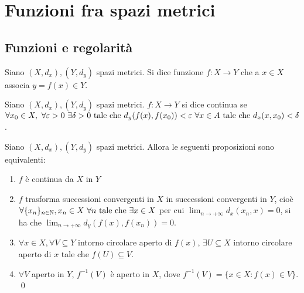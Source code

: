 \chapter{Funzioni fra spazi metrici}\label{chap:functions}

\section{Funzioni e regolarità}

\begin{definition}
    Siano $(X, d_x), (Y, d_y)$ spazi metrici. Si dice funzione $f: X \to Y$ che a $x \in X$ associa $y = f(x) \in Y$.
\end{definition}

\begin{definition}
    \label{def:f_cont}
    Siano $(X, d_x), (Y, d_y)$ spazi metrici. $f: X \to Y$ si dice continua se $\forall x_0 \in X, \ \forall \varepsilon > 0 \ \exists \delta > 0 \tc d_y(f(x), f(x_0)) < \varepsilon \ \forall x \in A \tc d_x(x, x_0) < \delta$.
\end{definition}

\begin{theorem}
    Siano $(X, d_x), (Y, d_y)$ spazi metrici. Allora le seguenti proposizioni sono equivalenti:
    \begin{enumerate}
        \item $f$ è continua da $X$ in $Y$
        
        \item $f$ trasforma successioni convergenti in $X$ in successioni convergenti in $Y$, cioè $\forall \{x_n\}_{n \in \N}, x_n \in X \ \forall n \tc \exists x \in X$ per cui $\displaystyle \lim_{n \to +\infty}d_x(x_n, x)=0$, si ha che $\displaystyle \lim_{n \to +\infty}d_y(f(x),f(x_n))=0$.
        
        \item $\forall x \in X, \forall V \subseteq Y$ intorno circolare aperto di $f(x)$, $\exists U \subseteq X$ intorno circolare aperto di $x$ tale che $f(U) \subseteq V$.

        \item $\forall V$ aperto in $Y$, $f^{-1}(V)$ è aperto in $X$, dove $f^{-1}(V)=\{x \in X : f(x) \in V\}$.
        \qed
    \end{enumerate}
\end{theorem}


